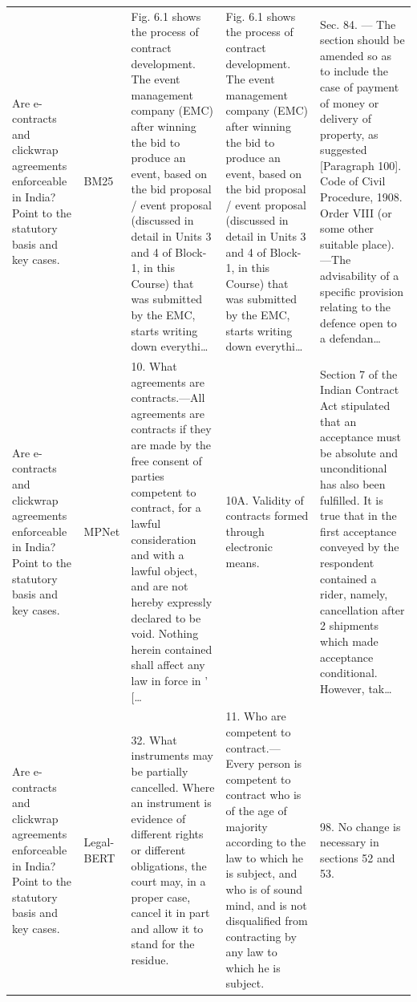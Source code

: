 \documentclass[11pt]{article}
\begin{document}
\begin{xltabular}{\textwidth}{|p{3.2cm}|p{2.2cm}|Y|Y|Y|}
        Are e-contracts and clickwrap agreements enforceable in India? Point to the statutory basis and key cases. & BM25 & Fig. 6.1 shows the process of contract development. The event management company (EMC) after winning the bid to produce an event, based on the bid proposal / event proposal (discussed in detail in Units 3 and 4 of Block- 1, in this Course) that was submitted by the EMC, starts writing down everythi… & Fig. 6.1 shows the process of contract development. The event management company (EMC) after winning the bid to produce an event, based on the bid proposal / event proposal (discussed in detail in Units 3 and 4 of Block- 1, in this Course) that was submitted by the EMC, starts writing down everythi… & Sec. 84. — The section should be amended so as to include the case of payment of money or delivery of property, as suggested [Paragraph 100]. Code of Civil Procedure, 1908. Order VIII (or some other suitable place).—The advisability of a specific provision relating to the defence open to a defendan… \\ 
        Are e-contracts and clickwrap agreements enforceable in India? Point to the statutory basis and key cases. & MPNet & 10. What agreements are contracts.—All agreements are contracts if they are made by the free consent of parties competent to contract, for a lawful consideration and with a lawful object, and are not hereby expressly declared to be void. Nothing herein contained shall affect any law in force in ' [… & 10A. Validity of contracts formed through electronic means. & Section 7 of the Indian Contract Act stipulated that an acceptance must be absolute and unconditional has also been fulfilled. It is true that in the first acceptance conveyed by the respondent contained a rider, namely, cancellation after 2 shipments which made acceptance conditional. However, tak… \\ 
        Are e-contracts and clickwrap agreements enforceable in India? Point to the statutory basis and key cases. & Legal-BERT & 32. What instruments may be partially cancelled. Where an instrument is evidence of different rights or different obligations, the court may, in a proper case, cancel it in part and allow it to stand for the residue. & 11. Who are competent to contract.—Every person is competent to contract who is of the age of majority according to the law to which he is subject, and who is of sound mind, and is not disqualified from contracting by any law to which he is subject. & 98. No change is necessary in sections 52 and 53. \\ 

\end{xltabular}
\end{document}
